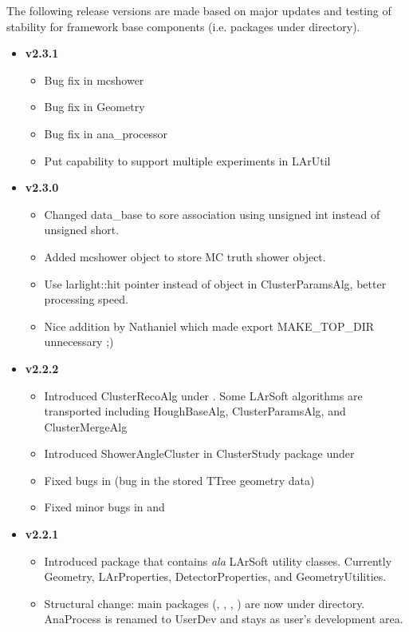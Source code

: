 The following release versions are made based on major updates and testing of stability for framework base components (i.e. packages under \Core directory). 
\begin{itemize}

\item[] {\bf v2.3.1}
  \begin{itemize}
  \item Bug fix in {\ttfamily mcshower} 
  \item Bug fix in {\ttfamily Geometry}
  \item Bug fix in {\ttfamily ana\_processor}
  \item Put capability to support multiple experiments in {\ttfamily LArUtil}
  \end{itemize}


\item[] {\bf v2.3.0}
  \begin{itemize}
    \item Changed {\ttfamily data\_base} to sore association using {\ttfamily unsigned int} instead of {\ttfamily unsigned short}.
    \item Added {\ttfamily mcshower} object to store MC truth shower object.
    \item Use {\ttfamily larlight::hit} pointer instead of object in {\ttfamily ClusterParamsAlg}, better processing speed.
    \item Nice addition by Nathaniel which made {\ttfamily export MAKE\_TOP\_DIR} unnecessary ;)
  \end{itemize}

\item[] {\bf v2.2.2}
  \begin{itemize}
    \item Introduced ClusterRecoAlg under \UserDev. Some LArSoft algorithms are transported including HoughBaseAlg, ClusterParamsAlg, and ClusterMergeAlg
    \item Introduced ShowerAngleCluster in ClusterStudy package under \UserDev
    \item Fixed bugs in \LArUtil (bug in the stored TTree geometry data)
    \item Fixed minor bugs in \DataFormat and \Analysis
  \end{itemize}

\item[] {\bf v2.2.1}
  \begin{itemize}
    \item Introduced \LArUtil package that contains {\it ala} LArSoft utility classes. Currently {\ttfamily Geometry}, {\ttfamily LArProperties}, {\ttfamily DetectorProperties}, and {\ttfamily GeometryUtilities}.
    \item Structural change: main packages (\Base, \DataFormat, \Analysis, \LArUtil) are now under \Core directory. {\ttfamily AnaProcess} is renamed to {\ttfamily UserDev} and stays as user's development area.
  \end{itemize}


\end{itemize}
